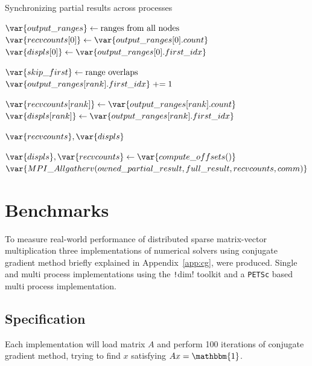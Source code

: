 \documentclass[thesis=M,english]{FITthesis}[2019/12/23]
\newcommand{\csre}[1]{\texttt!#1!}
\newcommand{\pluseq}{\mathrel{+}=}
\begin{document}
\begin{algorithm}[htp]
    \caption{Synchronizing partial results across processes}
    \begin{algorithmic}
        \State $\var{output\_ranges} \gets \text{ranges from all nodes}$
        \State $\var{recvcounts[0]} \gets \var{output\_ranges[0].count}$
        \State $\var{displs[0]} \gets \var{output\_ranges[0].first\_idx}$


        \State $\var{skip\_first} \gets \text{range overlaps}$
        \State $\var{output\_ranges[rank].first\_idx} \pluseq 1$
        \EndIf

        \State $\var{recvcounts[rank]} \gets \var{output\_ranges[rank].count}$
        \State $\var{displs[rank]} \gets \var{output\_ranges[rank].first\_idx}$

        \EndFor

        \Return $\var{recvcounts}, \var{displs}$

        \EndFunction

        \State $\var{displs}, \var{recvcounts} \gets \var{compute\_offsets()}$
        \State $\var{MPI\_Allgatherv(owned\_partial\_result, full\_result, recvcounts, comm)}$

        \EndFunction
    \end{algorithmic}
\end{algorithm}


\chapter{Benchmarks}

To measure real-world performance of distributed sparse matrix-vector multiplication
three implementations of numerical solvers using conjugate gradient method briefly explained in
Appendix~\ref{app:cg}, were produced.
Single and multi process implementations using the \csre{dim} toolkit 
and a \texttt{PETSc} based multi process implementation.

\section{Specification}

Each implementation will load matrix $A$ and perform 100 iterations of conjugate
gradient method, trying to find $x$ satisfying $Ax=\mathbbm{1}$.
\end{document}
